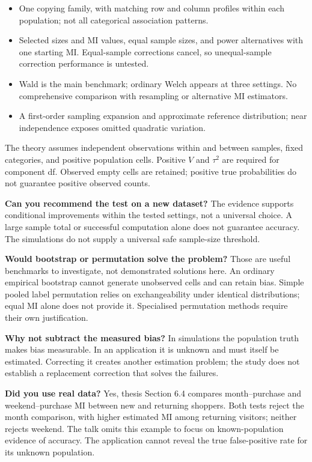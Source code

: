 \begin{itemize}
\item One copying family, with matching row and column profiles within each population; not all categorical association patterns.
\item Selected sizes and MI values, equal sample sizes, and power alternatives with one starting MI. Equal-sample corrections cancel, so unequal-sample correction performance is untested.
\item Wald is the main benchmark; ordinary Welch appears at three settings. No comprehensive comparison with resampling or alternative MI estimators.
\item A first-order sampling expansion and approximate reference distribution; near independence exposes omitted quadratic variation.
\end{itemize}
The theory assumes independent observations within and between samples, fixed categories, and positive population cells. Positive \(V\) and \(\tau^2\) are required for component df. Observed empty cells are retained; positive true probabilities do not guarantee positive observed counts.

\textbf{Can you recommend the test on a new dataset?} The evidence supports conditional improvements within the tested settings, not a universal choice. A large sample total or successful computation alone does not guarantee accuracy. The simulations do not supply a universal safe sample-size threshold.

\textbf{Would bootstrap or permutation solve the problem?} Those are useful benchmarks to investigate, not demonstrated solutions here. An ordinary empirical bootstrap cannot generate unobserved cells and can retain bias. Simple pooled label permutation relies on exchangeability under identical distributions; equal MI alone does not provide it. Specialised permutation methods require their own justification.

\textbf{Why not subtract the measured bias?} In simulations the population truth makes bias measurable. In an application it is unknown and must itself be estimated. Correcting it creates another estimation problem; the study does not establish a replacement correction that solves the failures.

\textbf{Did you use real data?} Yes, thesis Section 6.4 compares month--purchase and weekend--purchase MI between new and returning shoppers. Both tests reject the month comparison, with higher estimated MI among returning visitors; neither rejects weekend. The talk omits this example to focus on known-population evidence of accuracy. The application cannot reveal the true false-positive rate for its unknown population.

